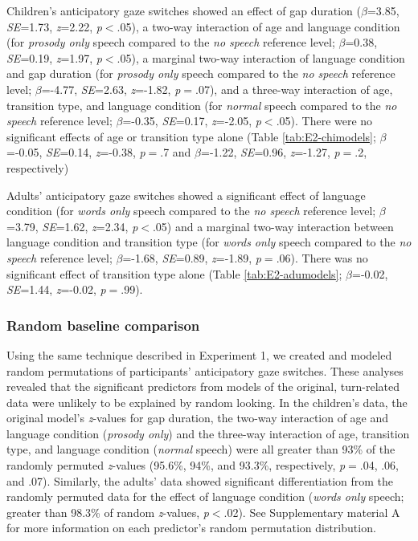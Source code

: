 \documentclass[authoryear, 12pt]{elsarticle}
\begin{document}
Children's anticipatory gaze switches showed an effect of gap duration (\textit{$\beta$}=3.85, \textit{SE}=1.73, \textit{z}=2.22, \textit{p}$<$.05), a two-way interaction of age and language condition (for \textit{prosody only} speech compared to the \textit{no speech} reference level; \textit{$\beta$}=0.38, \textit{SE}=0.19, \textit{z}=1.97, \textit{p}$<$.05), a marginal two-way interaction of language condition and gap duration (for \textit{prosody only} speech compared to the \textit{no speech} reference level; \textit{$\beta$}=-4.77, \textit{SE}=2.63, \textit{z}=-1.82, \textit{p}$=$.07), and a three-way interaction of age, transition type, and language condition (for \textit{normal} speech compared to the \textit{no speech} reference level; \textit{$\beta$}=-0.35, \textit{SE}=0.17, \textit{z}=-2.05, \textit{p}$<$.05). There were no significant effects of age or transition type alone (Table \ref{tab:E2-chimodels}; \textit{$\beta$}=-0.05, \textit{SE}=0.14, \textit{z}=-0.38, \textit{p}$=$.7 and \textit{$\beta$}=-1.22, \textit{SE}=0.96, \textit{z}=-1.27, \textit{p}$=$.2, respectively)

Adults' anticipatory gaze switches showed a significant effect of language condition (for \textit{words only} speech compared to the \textit{no speech} reference level; \textit{$\beta$}=3.79, \textit{SE}=1.62, \textit{z}=2.34, \textit{p}$<$.05) and a marginal two-way interaction between language condition and transition type (for \textit{words only} speech compared to the \textit{no speech} reference level; \textit{$\beta$}=-1.68, \textit{SE}=0.89, \textit{z}=-1.89, \textit{p}$=$.06). There was no significant effect of transition type alone (Table \ref{tab:E2-adumodels}; \textit{$\beta$}=-0.02, \textit{SE}=1.44, \textit{z}=-0.02, \textit{p}$=$.99).


\subsubsection*{Random baseline comparison}
\label{sec:randbaseline2}

Using the same technique described in Experiment 1, we created and modeled random permutations of participants' anticipatory gaze switches. These analyses revealed that the significant predictors from models of the original, turn-related data were unlikely to be explained by random looking. In the children's data, the original model's \textit{z}-values for gap duration, the two-way interaction of age and language condition (\textit{prosody only}) and the three-way interaction of age, transition type, and language condition (\textit{normal} speech) were all greater than 93\% of the randomly permuted \textit{z}-values (95.6\%, 94\%, and 93.3\%, respectively, \textit{p}$=$.04, .06, and .07). Similarly, the adults' data showed significant differentiation from the randomly permuted data for the effect of language condition (\textit{words only} speech; greater than 98.3\% of random \textit{z}-values, \textit{p}$<$.02). See Supplementary material A for more information on each predictor's random permutation distribution.
\end{document}
